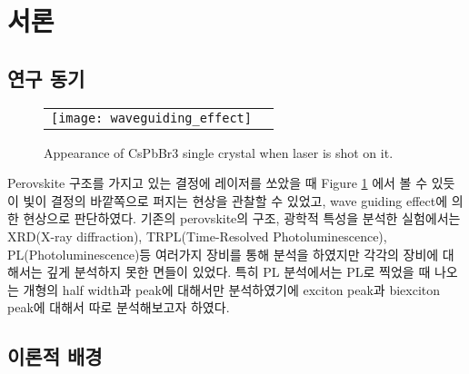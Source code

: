 
\section{서론}
\subsection{연구 동기}
\begin{figure}[H]
	\begin{center}
		\begin{tabular}{cc}
			\texttt{[image: waveguiding\_effect]}
		\end{tabular}
	\end{center}
	\caption{Appearance of CsPbBr3 single crystal when laser is shot on it.}
	\label{fig:waveguide}  
\end{figure}
Perovskite 구조를 가지고 있는 결정에 레이저를 쏘았을 때 Figure \ref{fig:waveguide} 에서 볼 수 있듯이 빛이 결정의 바깥쪽으로 퍼지는 현상을 관찰할 수 있었고, wave guiding effect에 의한 현상으로 판단하였다. 기존의 perovskite의 구조, 광학적 특성을 분석한 실험에서는 XRD(X-ray diffraction), TRPL(Time-Resolved Photoluminescence), PL(Photoluminescence)등 여러가지 장비를 통해 분석을 하였지만 각각의 장비에 대해서는 깊게 분석하지 못한 면들이 있었다. 특히 PL 분석에서는 PL로 찍었을 때 나오는 개형의 half width과 peak에 대해서만 분석하였기에 exciton peak과 biexciton peak에 대해서 따로 분석해보고자 하였다. 
 

\subsection{이론적 배경}
